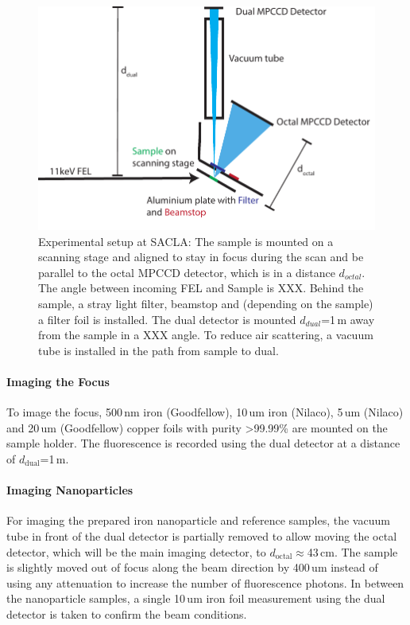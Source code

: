 \begin{figure}
	\centering
	\includegraphics[width=0.75\linewidth]{images/setup.pdf}
	\caption[Experimental setup at SACLA]{Experimental setup at SACLA: The sample is mounted on a scanning stage and aligned to stay in focus during the scan and be parallel to the octal MPCCD detector, which is in a distance $d_{octal}$. The angle between incoming FEL and Sample is XXX. Behind the sample, a stray light filter, beamstop and (depending on the sample) a filter foil is installed. The dual detector is mounted $d_{dual}$=1\,m away from the sample in a XXX angle. To reduce air scattering, a vacuum tube is installed in the path from sample to dual.}
	\label{fig:setup}
\end{figure}
\paragraph{Imaging the Focus}
To image the focus, 500\,nm iron (Goodfellow), 10\,um iron (Nilaco), 5\,um (Nilaco) and 20\,um (Goodfellow) copper foils with purity >99.99\% are mounted on the sample holder. The fluorescence is recorded using the dual detector at a distance of $d_\text{dual}$=1\,m.
\paragraph{Imaging Nanoparticles}
For imaging the prepared iron nanoparticle and reference samples, the vacuum tube in front of the dual detector is partially removed to allow moving the octal detector, which will be the main imaging detector, to $d_\text{octal}\approx$43\,cm. The sample is slightly moved out of focus along the beam direction by 400\,um instead of using any attenuation to increase the number of fluorescence photons. In between the nanoparticle samples, a single 10\,um iron foil measurement using the dual detector is taken to confirm the beam conditions.
